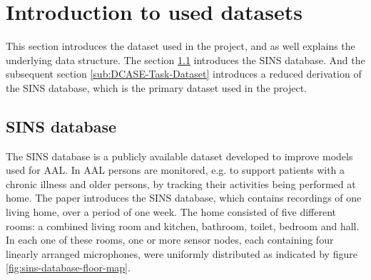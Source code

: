 \section{Introduction to used datasets}
\label{sec:Introduction-Used-Datasets}
This section introduces the dataset used in the project, and as well explains the underlying data structure. The section \ref{sub:SINS-Database} introduces the \gls{SINS} database. And the subsequent section \ref{sub:DCASE-Task-Dataset} introduces a reduced derivation of the \gls{SINS} database, which is the primary dataset used in the project.

\subsection{SINS database}
\label{sub:SINS-Database}
The \gls{SINS} database is a publicly available dataset developed to improve models used for \gls{AAL}. In \gls{AAL} persons are monitored, e.g. to support patients with a chronic illness and older persons, by tracking their activities being performed at home.
\newline
\newline
The paper \cite{dekkers_sins_2017} introduces the \gls{SINS} database, which contains recordings of one living home, over a period of one week. The home consisted of five different rooms: a combined living room and kitchen, bathroom, toilet, bedroom and hall. In each one of these rooms, one or more sensor nodes, each containing four linearly arranged microphones, were uniformly distributed as indicated by figure \ref{fig:sins-database-floor-map}.


